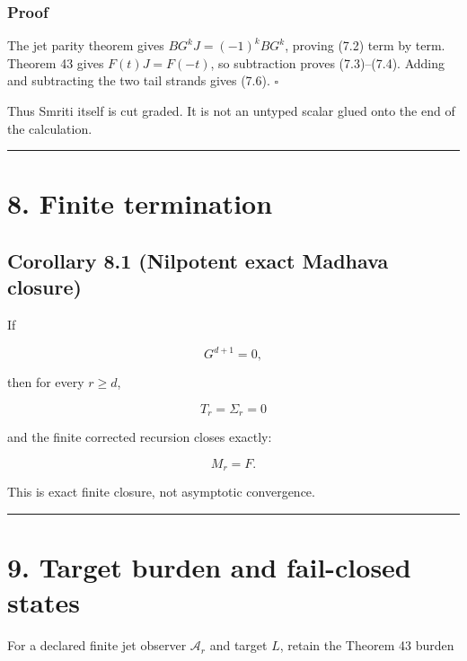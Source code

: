 \hypertarget{proof-4}{%
\subsubsection{Proof}\label{proof-4}}

The jet parity theorem gives \(BG^kJ=(-1)^kBG^k\), proving (7.2) term by
term. Theorem 43 gives \(F(t)J=F(-t)\), so subtraction proves (7.3)--(7.4).
Adding and subtracting the two tail strands gives (7.6). \(\square\)

Thus Smriti itself is cut graded. It is not an untyped scalar glued onto the
end of the calculation.

\begin{center}\rule{0.5\linewidth}{0.5pt}\end{center}

\hypertarget{finite-termination}{%
\section{8. Finite termination}\label{finite-termination}}

\hypertarget{corollary-8.1-nilpotent-exact-madhava-closure}{%
\subsection{Corollary 8.1 (Nilpotent exact Madhava closure)}\label{corollary-8.1-nilpotent-exact-madhava-closure}}

If

\[
G^{d+1}=0,
\]

then for every \(r\ge d\),

\[
\boxed{T_r=\Sigma_r=0}
\tag{8.1}
\]

and the finite corrected recursion closes exactly:

\[
\boxed{M_r=F.}
\tag{8.2}
\]

This is exact finite closure, not asymptotic convergence.

\begin{center}\rule{0.5\linewidth}{0.5pt}\end{center}

\hypertarget{target-burden-and-fail-closed-states}{%
\section{9. Target burden and fail-closed states}\label{target-burden-and-fail-closed-states}}

For a declared finite jet observer \(\mathcal A_r\) and target \(L\), retain the
Theorem 43 burden

